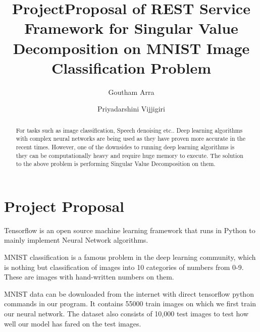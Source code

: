 
\title{ProjectProposal of REST Service Framework for Singular Value 
Decomposition on MNIST Image Classification Problem}

\author{Goutham Arra}

\author{Priyadarshini Vijjigiri}

\renewcommand{\shortauthors}{G. v. Laszewski}


\begin{abstract} 
For tasks such as image classification, Speech denoising etc..
Deep learning algorithms with complex  neural networks are being used as they
have proven more accurate in the recent  times. However, one of the downsides to
running deep learning algorithms is they can be computationally heavy and
require huge memory to execute. The solution to  the above problem is performing
Singular Value Decomposition on them.


\end{abstract}



\maketitle

\section{Project Proposal}

Tensorflow is an open source machine learning framework that runs in Python to 
mainly implement Neural Network algorithms. 

MNIST classification is a famous problem in the deep learning community, which
is  nothing but classification of images into 10 categories of numbers from 0-9.
These are images with hand-written numbers on them.

MNIST data can be downloaded from the internet with direct tensorflow python
commands in our program. It contains 55000 train images on which we first train 
our neural network. The dataset also consists of 10,000 test images to test
how well our model has fared on the test images.

